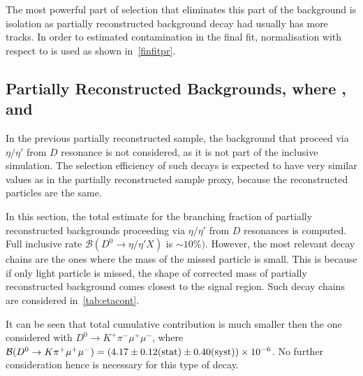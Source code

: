 The most powerful part of selection that eliminates this part of the background is isolation as partially reconstructed background decay had usually has more tracks. In order to estimated contamination in the final fit, normalisation with respect to \bjpsimumuk is used as shown in~\autoref{finfitpr}.

\subsection{Partially Reconstructed Backgrounds, where , and }
\label{etasec}
In the previous partially reconstructed sample, the background that proceed via $\eta/\eta'$ from $D$ resonance is not considered, as it is not part of the inclusive simulation. The selection efficiency of such decays is expected to have very similar values as in the partially reconstructed sample proxy, because the reconstructed particles are the same.

In this section, the total estimate for the branching fraction of partially reconstructed backgrounds proceeding via $\eta/\eta'$ from $D$ resonances is computed. Full inclusive rate $\mathcal{B} (D^{0} \rightarrow \eta / \eta' X)$ is $ \sim 10 \%)$. However, the most relevant decay chains are the ones where the mass of the missed particle is small. This is because if only light particle is missed, the shape of corrected mass of partially reconstructed background comes closest to the signal region. Such decay chains are considered in~\autoref{tab:etacont}.

It can be seen that total cumulative contribution is much smaller then the one considered with $D^{0}\rightarrow K^{+} \pi^{-} \mu^{+} \mu^{-}$, where $\mathcal{B}(D^0 \rightarrow K \pi^+ \mu^{+} \mu^{-}) = (4.17\pm0.12 \rm{(stat)}\pm 0.40 \rm{(syst)})\times 10^{-6}$\cite{Aaij:2015hva}. No further consideration hence is necessary for this type of decay.

